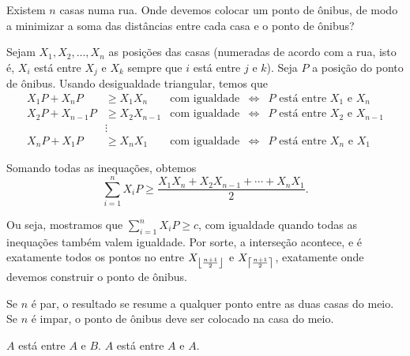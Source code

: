 \documentclass[12pt, a4paper]{article}
\newcommand{\rulesep}{
	\vspace{4mm}

}
\begin{document}
	\pagestyle{empty}
	
	\contesttitle
	
	\rulesep
	

	\newpage

	\begin{prob}
		Existem $n$ casas numa rua. Onde devemos colocar um ponto de ônibus, de modo a minimizar a soma das distâncias entre cada casa e o ponto de ônibus?
	\end{prob}
	\begin{sol}
		Sejam $X_1, X_2, \dots, X_n$ as posições das casas (numeradas de acordo com a rua, isto é, $X_i$ está entre $X_j$ e $X_k$ sempre que $i$ está entre $j$ e $k$). Seja $P$ a posição do ponto de ônibus. Usando desigualdade triangular, temos que
		\begin{align*}
			X_1P + X_nP     &\ge X_1X_n     & \text{com igualdade} &\iff& \text{$P$ está entre $X_1$ e $X_n$}  \\
			X_2P + X_{n-1}P &\ge X_2X_{n-1} & \text{com igualdade} &\iff& \text{$P$ está entre $X_2$ e $X_{n-1}$} \\
							&\vdots         &                      &    & \\
			X_nP + X_1P     &\ge X_nX_1     & \text{com igualdade} &\iff& \text{$P$ está entre $X_n$ e $X_1$}
		\end{align*}
		
		Somando todas as inequações, obtemos \[ \sum_{i=1}^n X_iP \ge \frac{X_1X_n + X_2X_{n-1} + \cdots + X_nX_1}{2}.\]

		Ou seja, mostramos que $\sum_{i=1}^n X_iP \ge c$, com igualdade quando todas as inequações também valem igualdade. Por sorte, a interseção acontece, e é exatamente todos os pontos no entre $X_{\left \lfloor{\frac{n+1}{2}}\right \rfloor}$ e $X_{\left \lceil{\frac{n+1}{2}}\right \rceil}$, exatamente onde devemos construir o ponto de ônibus.

		\begin{rem}
			Se $n$ é par, o resultado se resume a qualquer ponto entre as duas casas do meio. Se $n$ é impar, o ponto de ônibus deve ser colocado na casa do meio.
		\end{rem}

		\begin{rem}
			$A$ está entre $A$ e $B$. $A$ está entre $A$ e $A$.
		\end{rem}
	\end{sol}

	\newpage


	\newpage




\end{document}
